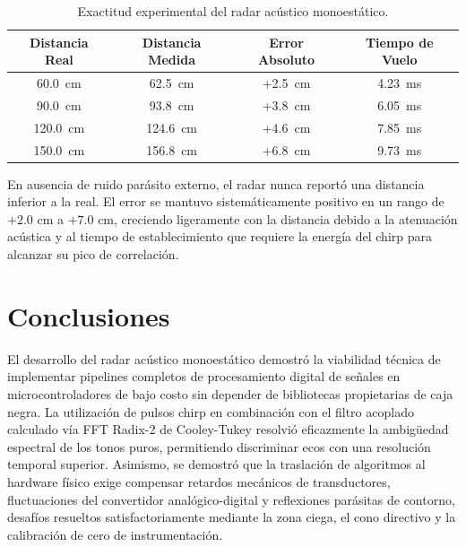 \documentclass[journal]{IEEEtran}
\begin{document}
\begin{table}[!t]
\renewcommand{\arraystretch}{1.2}
\caption{Exactitud experimental del radar ac\'ustico monoest\'atico.}
\label{tab:precision}
\centering
\begin{tabular}{cccc}
\toprule
\textbf{Distancia Real} & \textbf{Distancia Medida} & \textbf{Error Absoluto} & \textbf{Tiempo de Vuelo} \\
\midrule
60.0~cm  & 62.5~cm  & +2.5~cm & 4.23~ms \\
90.0~cm  & 93.8~cm  & +3.8~cm & 6.05~ms \\
120.0~cm & 124.6~cm & +4.6~cm & 7.85~ms \\
150.0~cm & 156.8~cm & +6.8~cm & 9.73~ms \\
\bottomrule
\end{tabular}
\end{table}

En ausencia de ruido par\'asito externo, el radar nunca report\'o una distancia inferior a la real. El error se mantuvo sistem\'aticamente positivo en un rango de $+2.0\text{ cm}$ a $+7.0\text{ cm}$, creciendo ligeramente con la distancia debido a la atenuaci\'on ac\'ustica y al tiempo de establecimiento que requiere la energ\'ia del chirp para alcanzar su pico de correlaci\'on.

\section{Conclusiones}
El desarrollo del radar ac\'ustico monoest\'atico demostr\'o la viabilidad t\'ecnica de implementar pipelines completos de procesamiento digital de se\~nales en microcontroladores de bajo costo sin depender de bibliotecas propietarias de caja negra. La utilizaci\'on de pulsos chirp en combinaci\'on con el filtro acoplado calculado v\'ia FFT Radix-2 de Cooley-Tukey resolvi\'o eficazmente la ambig\"uedad espectral de los tonos puros, permitiendo discriminar ecos con una resoluci\'on temporal superior. Asimismo, se demostr\'o que la traslaci\'on de algoritmos al hardware f\'isico exige compensar retardos mec\'anicos de transductores, fluctuaciones del convertidor anal\'ogico-digital y reflexiones par\'asitas de contorno, desaf\'ios resueltos satisfactoriamente mediante la zona ciega, el cono directivo y la calibraci\'on de cero de instrumentaci\'on.
\end{document}
